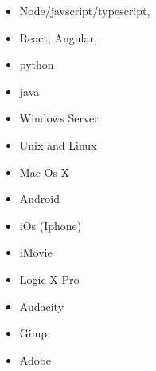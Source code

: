 
\begin{cvcolumns}
    {\begin{itemize}
            \item Node/javscript/typescript,
            \item React, Angular, 
            \item python  
            \item java
    \end{itemize}}
    {\begin{itemize}
            \item Windows Server  
            \item Unix and Linux
            \item Mac Os X 
            \item Android
            \item iOs (Iphone)
    \end{itemize}}
    {\begin{itemize}
            \item iMovie
            \item Logic X Pro
            \item Audacity
            \item Gimp
            \item Adobe
    \end{itemize}}
\end{cvcolumns} 
